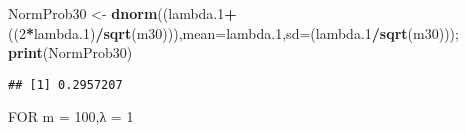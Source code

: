 \documentclass[
]{article}
\newenvironment{Shaded}{\begin{snugshade}}{\end{snugshade}}
\newcommand{\DataTypeTok}[1]{\textcolor[rgb]{0.13,0.29,0.53}{#1}}
\newcommand{\DecValTok}[1]{\textcolor[rgb]{0.00,0.00,0.81}{#1}}
\newcommand{\FloatTok}[1]{\textcolor[rgb]{0.00,0.00,0.81}{#1}}
\newcommand{\KeywordTok}[1]{\textcolor[rgb]{0.13,0.29,0.53}{\textbf{#1}}}
\newcommand{\NormalTok}[1]{#1}
\newcommand{\OperatorTok}[1]{\textcolor[rgb]{0.81,0.36,0.00}{\textbf{#1}}}
\newcommand{\StringTok}[1]{\textcolor[rgb]{0.31,0.60,0.02}{#1}}
\begin{document}
\begin{Shaded}
\begin{Highlighting}[]
\NormalTok{NormProb30 <-}\StringTok{ }\KeywordTok{dnorm}\NormalTok{((lambda}\FloatTok{.1}\OperatorTok{+}\NormalTok{((}\DecValTok{2}\OperatorTok{*}\NormalTok{lambda}\FloatTok{.1}\NormalTok{)}\OperatorTok{/}\KeywordTok{sqrt}\NormalTok{(m30))),}\DataTypeTok{mean=}\NormalTok{lambda}\FloatTok{.1}\NormalTok{,}\DataTypeTok{sd=}\NormalTok{(lambda}\FloatTok{.1}\OperatorTok{/}\KeywordTok{sqrt}\NormalTok{(m30))); }\KeywordTok{print}\NormalTok{(NormProb30)}
\end{Highlighting}
\end{Shaded}

\begin{verbatim}
## [1] 0.2957207
\end{verbatim}

FOR m = 100,λ = 1
\end{document}
